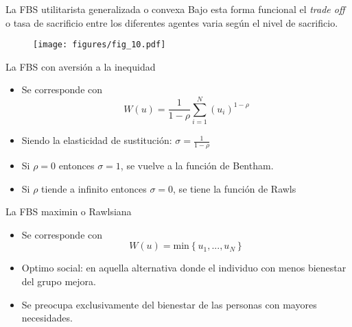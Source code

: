 \begin{frame}{La FBS utilitarista generalizada o convexa}
Bajo esta forma funcional el \emph{trade off} o tasa de sacrificio entre los diferentes agentes varia según el nivel de sacrificio.
	\begin{figure}[!h]
		\centering
		\hspace{1.2cm}\texttt{[image: figures/fig\_10.pdf]}
	\end{figure}
\end{frame}
\begin{frame}{La FBS con aversión a la inequidad}
	\begin{itemize}
		\item Se corresponde con
					$$W(u) = \frac{1}{1-\rho} \sum_{i = 1}^{N} (u_i)^{1-\rho}$$
		\item Siendo la elasticidad de sustitución: $\sigma = \frac{1}{1-\rho}$
		\item Si $\rho = 0$ entonces $\sigma = 1$, se vuelve a la función de Bentham.
		\item Si $\rho$ tiende a infinito entonces $\sigma = 0$, se tiene la función de Rawls
	\end{itemize}
\end{frame}
\begin{frame}{La FBS maximin o Rawlsiana}
	\begin{itemize}
		\item Se corresponde con
					$$W(u) = \text{min} \left\lbrace u_1, ..., u_N\right\rbrace $$
		\item Optimo social: en aquella alternativa donde el individuo con menos bienestar del grupo mejora.
		\item Se preocupa exclusivamente del bienestar de las personas con mayores necesidades.
	\end{itemize}
\end{frame}